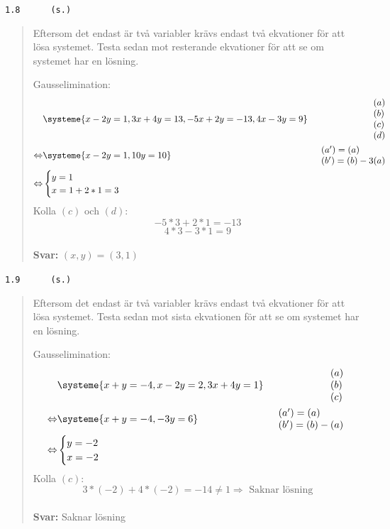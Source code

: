 \documentclass[a4paper]{article}
\newcommand{\tskcol}[1]{\textcolor{tskcol}{#1}}
\begin{document}
\texttt{\tskcol{1.8~~~~~ (s.)}}
\begin{quotation}
	\noindent
	Eftersom det endast är två variabler krävs endast två ekvationer för att lösa systemet. Testa sedan mot resterande ekvationer för att se om systemet har en lösning.
	
	Gausselimination:
	\begin{align*}
		&\systeme{
			  x-2y=1,
			 3x+4y=13,
			-5x+2y=-13,
			 4x-3y=9}  
		&\begin{array}{l} 
		(a) \\ 
		(b) \\
		(c) \\
		(d)
		\end{array} \\ \Leftrightarrow
		&\systeme{
			  x- 2y=1,
			    10y=10}  
		&\begin{array}{l} 
		(a')=(a) \\ 
		(b')=(b)-3(a)
		\end{array} \\ \Leftrightarrow
		&\begin{cases}
		y=1 \\
		x=1+2*1=3
		\end{cases}
	\end{align*}
	Kolla $(c)$ och $(d)$:
	\[-5*3+2*1=-13\]
	\[4*3-3*1=9\]
	\\
	\textbf{Svar:} $(x,y)=(3,1)$
\end{quotation}

\texttt{\tskcol{1.9~~~~~ (s.)}}
\begin{quotation}
	\noindent
	Eftersom det endast är två variabler krävs endast två ekvationer för att lösa systemet. Testa sedan mot sista ekvationen för att se om systemet har en lösning.
	
	Gausselimination:
	\begin{align*}
	&\systeme{
		 x+ y=-4,
		 x-2y=2,
		3x+4y=1}  
	&\begin{array}{l} 
	(a) \\ 
	(b) \\
	(c)
	\end{array} \\ \Leftrightarrow
	&\systeme{
		x+ y=-4,
		 -3y=6}  
	&\begin{array}{l} 
	(a')=(a) \\ 
	(b')=(b)-(a)
	\end{array} \\ \Leftrightarrow
	&\begin{cases}
	y=-2 \\
	x=-2
	\end{cases}
	\end{align*}
	Kolla $(c)$:
	\[3*(-2)+4*(-2)=-14\neq1 \Rightarrow \text{ Saknar lösning}\]
	\\
	\textbf{Svar:} Saknar lösning
\end{quotation}
\end{document}
